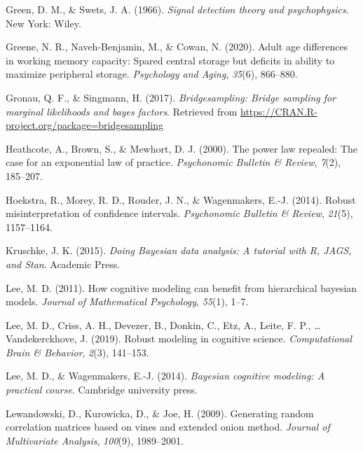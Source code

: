 \documentclass[
  english,
  ,man,floatsintext]{apa6}
\begin{document}
\leavevmode\hypertarget{ref-GreenAndSwets1966}{}%
Green, D. M., \& Swets, J. A. (1966). \emph{Signal detection theory and psychophysics}. New York: Wiley.

\leavevmode\hypertarget{ref-GreeneEtAl2020}{}%
Greene, N. R., Naveh-Benjamin, M., \& Cowan, N. (2020). Adult age differences in working memory capacity: Spared central storage but deficits in ability to maximize peripheral storage. \emph{Psychology and Aging}, \emph{35}(6), 866--880.

\leavevmode\hypertarget{ref-bridgesampling}{}%
Gronau, Q. F., \& Singmann, H. (2017). \emph{Bridgesampling: Bridge sampling for marginal likelihoods and bayes factors}. Retrieved from \url{https://CRAN.R-project.org/package=bridgesampling}

\leavevmode\hypertarget{ref-heathcote2000power}{}%
Heathcote, A., Brown, S., \& Mewhort, D. J. (2000). The power law repealed: The case for an exponential law of practice. \emph{Psychonomic Bulletin \& Review}, \emph{7}(2), 185--207.

\leavevmode\hypertarget{ref-HoekstraEtAl2014}{}%
Hoekstra, R., Morey, R. D., Rouder, J. N., \& Wagenmakers, E.-J. (2014). Robust misinterpretation of confidence intervals. \emph{Psychonomic Bulletin \& Review}, \emph{21}(5), 1157--1164.

\leavevmode\hypertarget{ref-Kruschke2015}{}%
Kruschke, J. K. (2015). \emph{Doing Bayesian data analysis: A tutorial with R, JAGS, and Stan}. Academic Press.

\leavevmode\hypertarget{ref-lee2011cognitive}{}%
Lee, M. D. (2011). How cognitive modeling can benefit from hierarchical bayesian models. \emph{Journal of Mathematical Psychology}, \emph{55}(1), 1--7.

\leavevmode\hypertarget{ref-LeeEtAl2019}{}%
Lee, M. D., Criss, A. H., Devezer, B., Donkin, C., Etz, A., Leite, F. P., \ldots{} Vandekerckhove, J. (2019). Robust modeling in cognitive science. \emph{Computational Brain \& Behavior}, \emph{2}(3), 141--153.

\leavevmode\hypertarget{ref-lee2014bayesian}{}%
Lee, M. D., \& Wagenmakers, E.-J. (2014). \emph{Bayesian cognitive modeling: A practical course}. Cambridge university press.

\leavevmode\hypertarget{ref-lewandowski2009generating}{}%
Lewandowski, D., Kurowicka, D., \& Joe, H. (2009). Generating random correlation matrices based on vines and extended onion method. \emph{Journal of Multivariate Analysis}, \emph{100}(9), 1989--2001.
\end{document}
